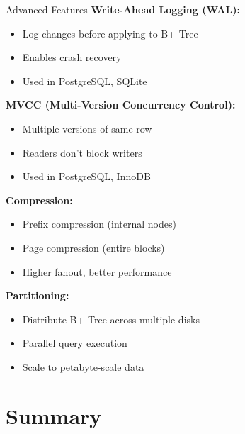 \documentclass[aspectratio=169]{beamer}
\begin{document}
\begin{frame}{Advanced Features}
  \textbf{Write-Ahead Logging (WAL):}
  \begin{itemize}
    \item Log changes before applying to B+ Tree
    \item Enables crash recovery
    \item Used in PostgreSQL, SQLite
  \end{itemize}

  \vspace{0.3cm}
  \textbf{MVCC (Multi-Version Concurrency Control):}
  \begin{itemize}
    \item Multiple versions of same row
    \item Readers don't block writers
    \item Used in PostgreSQL, InnoDB
  \end{itemize}

  \vspace{0.3cm}
  \textbf{Compression:}
  \begin{itemize}
    \item Prefix compression (internal nodes)
    \item Page compression (entire blocks)
    \item Higher fanout, better performance
  \end{itemize}

  \vspace{0.3cm}
  \textbf{Partitioning:}
  \begin{itemize}
    \item Distribute B+ Tree across multiple disks
    \item Parallel query execution
    \item Scale to petabyte-scale data
  \end{itemize}
\end{frame}

\section{Summary}
\end{document}
